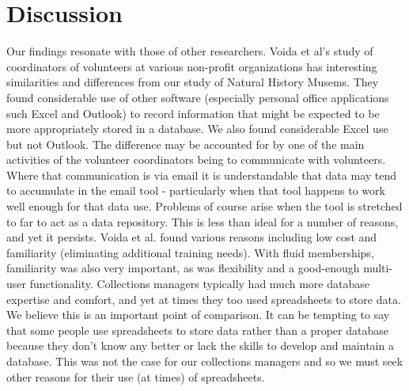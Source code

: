 \section{Discussion}
Our findings resonate with those of other researchers.
Voida et al's study of coordinators of volunteers at various non-profit organizations has interesting similarities and differences from our study of Natural History Musems. They found considerable use of other software (especially personal office applications such Excel and Outlook) to record information that might be expected to be more appropriately stored in a database. We also found considerable Excel use but not Outlook. The difference may be accounted for by one of the main activities of the volunteer coordinators being to communicate with volunteers. Where that communication is via email it is understandable that data may tend to accumulate in the email tool - particularly when that tool happens to work well enough for that data use. Problems of course arise when the tool is stretched to far to act as a data repository. This is less than ideal for a number of reasons, and yet it persists. Voida et al. found various reasons including low cost and familiarity (eliminating additional training needs). With fluid memberships, familiarity was also very important, as was flexibility and a good-enough multi-user functionality. Collections managers typically had much more database expertise and comfort, and yet at times they too used spreadsheets to store data. We believe this is an important point of comparison. It can be tempting to say that some people use spreadsheets to store data rather than a proper database because they don't know any better or lack the skills to develop and maintain a database. This was not the case for our collections managers and so we must seek other reasons for their use (at times) of spreadsheets.

